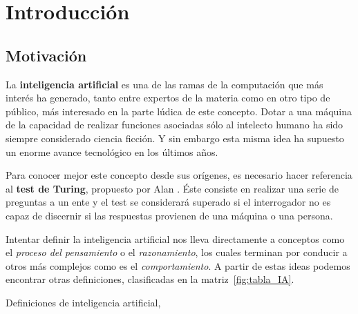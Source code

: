 \chapter{Introducción}
\label{cap:introduccion}



\section{Motivación}

La \textbf{inteligencia artificial} es una de las ramas de la computación que más interés ha generado, tanto entre expertos de la materia como en otro tipo de público, más interesado en la parte lúdica de este concepto. Dotar a una máquina de la capacidad de realizar funciones asociadas sólo al intelecto humano ha sido siempre considerado ciencia ficción. Y sin embargo esta misma idea ha supuesto un enorme avance tecnológico en los últimos años.

Para conocer mejor este concepto desde sus orígenes, es necesario hacer referencia al \textbf{test de Turing}, propuesto por Alan \citet{Turing1950-TURCMA}. Éste consiste en realizar una serie de preguntas a un ente y el test se considerará superado si el interrogador no es capaz de discernir si las respuestas provienen de una máquina o una persona.

Intentar definir la inteligencia artificial nos lleva directamente a conceptos como el \textit{proceso del pensamiento} o el \textit{razonamiento}, los cuales terminan por conducir a otros más complejos como es el \textit{comportamiento}. A partir de estas ideas podemos encontrar otras definiciones, clasificadas en la matriz~\ref{fig:tabla_IA}.

%
       {Definiciones de inteligencia artificial, \citet{Russell:2009:AIM:1671238}}

